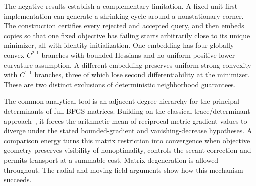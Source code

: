 The negative results establish a complementary limitation. A fixed unit-first
implementation can generate a shrinking cycle around a nonstationary corner.
The construction certifies every rejected and accepted query, and then embeds
copies so that one fixed objective has failing starts arbitrarily close to
its unique minimizer, all with identity initialization. One embedding has
four globally convex $C^{2,1}$ branches with bounded Hessians and no uniform
positive lower-curvature assumption. A different embedding preserves uniform
strong convexity with $C^{1,1}$ branches, three of which lose second differentiability at
the minimizer. These are two distinct exclusions of deterministic
neighborhood guarantees.

The common analytical tool is an adjacent-degree hierarchy for the
principal determinants of full-BFGS matrices. Building on the classical
trace/determinant approach~\cite{FND_P76,FND_BN89,FND_N92}, it forces the
arithmetic mean of reciprocal metric-gradient values to diverge under the
stated bounded-gradient and vanishing-decrease hypotheses. A comparison
energy turns this matrix restriction into convergence when objective
geometry preserves visibility of nonoptimality, controls the secant
correction and permits transport at a summable cost. Matrix degeneration
is allowed throughout. The radial and moving-field arguments show how this
mechanism succeeds.
